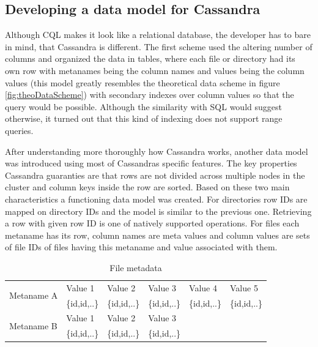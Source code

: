 \subsection{Developing a data model for Cassandra}

Although CQL makes it look like a relational database, the developer has to bare in mind, that
Cassandra is different. The first scheme used the altering number of columns and organized the 
data in tables, where each file or directory had its own row with metanames being the column
names and values being the column values (this model greatly resembles the theoretical data 
scheme in figure \ref{fig:theoDataScheme}) with secondary indexes over column values so that 
the query would be possible. Although the similarity with SQL would suggest otherwise, 
it turned out that this kind of indexing does not support range queries. 

After understanding more thoroughly how Cassandra works, another data model was introduced 
using most of Cassandras specific features. The key properties Cassandra guaranties are that 
rows are not divided across multiple nodes in the cluster and column keys inside the row
are sorted. Based on these two main characteristics a functioning data model was created. For  
directories row IDs are mapped on directory IDs and the model is similar to the previous one. 
Retrieving a row with given row ID is one of natively supported operations.
For files each metaname has its row, column names are meta values and column values are sets of 
file IDs of files having this metaname and value associated with them. 

\begin{table}[h]
\centering
\label{tab:fileMeta}
\begin{tabular}{|l|l|l|l|ll}
\hline
\multirow{2}{*}{Metaname A} & Value 1      & Value 2      & Value 3      & \multicolumn{1}{l|}{Value 4}      & \multicolumn{1}{l|}{Value 5}      \\ \cline{2-6}
                            & \{id,id,..\} & \{id,id,..\} & \{id,id,..\} & \multicolumn{1}{l|}{\{id,id,..\}} & \multicolumn{1}{l|}{\{id,id,..\}} \\ \hline
\multirow{2}{*}{Metaname B} & Value 1      & Value 2      & Value 3      &                                   &                                   \\ \cline{2-4}
                            & \{id,id,..\} & \{id,id,..\} & \{id,id,..\} &                                   &                                   \\ \cline{1-4}
\end{tabular}
\caption{File metadata}
\end{table}

